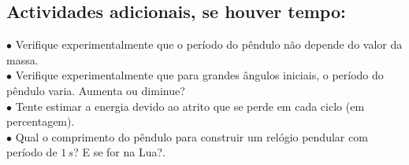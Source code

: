 \documentclass[a4paper,twoside,12pt]{article}      %
\begin{document}
\subsection{\sf Actividades adicionais, se houver tempo:}

 \begin{flushleft}
	 $\bullet$ Verifique experimentalmente que o período do pêndulo não depende do valor da massa.\\
	 $\bullet$ Verifique experimentalmente que para grandes ângulos iniciais, o período do pêndulo varia. Aumenta ou diminue?\\
	 $\bullet$ Tente estimar a energia  devido ao atrito que se perde em cada ciclo (em percentagem).\\
	 $\bullet$ Qual o comprimento do pêndulo para construir um relógio pendular com período de $1\,s$? 
	 E se for na Lua?.
\end{flushleft} 

 
\end{document}
